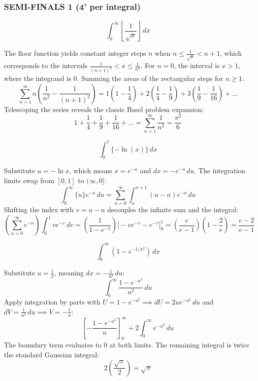 \subsubsection*{SEMI-FINALS 1 (4' per integral)}
\begin{questions}

    \question \[ \int_{0}^{\infty} \left\lfloor \frac{1}{\sqrt{x}} \right\rfloor \,dx \]
    \begin{solution}
        The floor function yields constant integer steps $n$ when $n \le \frac{1}{\sqrt{x}} < n+1$, which corresponds to the intervals $\frac{1}{(n+1)^2} < x \le \frac{1}{n^2}$. For $n=0$, the interval is $x > 1$, where the integrand is $0$. Summing the areas of the rectangular steps for $n \ge 1$:
        \[ \sum_{n=1}^{\infty} n \left( \frac{1}{n^2} - \frac{1}{(n+1)^2} \right) = 1\left(1 - \frac{1}{4}\right) + 2\left(\frac{1}{4} - \frac{1}{9}\right) + 3\left(\frac{1}{9} - \frac{1}{16}\right) + \dots \]
        Telescoping the series reveals the classic Basel problem expansion:
        \[ 1 + \frac{1}{4} + \frac{1}{9} + \frac{1}{16} + \dots = \sum_{n=1}^{\infty} \frac{1}{n^2} = \frac{\pi^2}{6} \]
    \end{solution}

    \question \[ \int_{0}^{1} \{-\ln(x)\} \,dx \]
    \begin{solution}
        Substitute $u = -\ln x$, which means $x = e^{-u}$ and $dx = -e^{-u} \,du$. The integration limits swap from $[0, 1]$ to $(\infty, 0]$:
        \[ \int_{0}^{\infty} \{u\}e^{-u} \,du = \sum_{n=0}^{\infty} \int_{n}^{n+1} (u - n)e^{-u} \,du \]
        Shifting the index with $v = u - n$ decouples the infinite sum and the integral:
        \[ \left(\sum_{n=0}^{\infty} e^{-n}\right) \int_{0}^{1} v e^{-v} \,dv = \left(\frac{1}{1 - e^{-1}}\right) \Big[ -ve^{-v} - e^{-v} \Big]_0^1 = \left(\frac{e}{e-1}\right)\left(1 - \frac{2}{e}\right) = \frac{e-2}{e-1} \]
    \end{solution}

    \question \[ \int_{0}^{\infty} (1 - e^{-1/x^2}) \,dx \]
    \begin{solution}
        Substitute $u = \frac{1}{x}$, meaning $dx = -\frac{1}{u^2} \,du$:
        \[ \int_{0}^{\infty} \frac{1 - e^{-u^2}}{u^2} \,du \]
        Apply integration by parts with $U = 1 - e^{-u^2} \implies dU = 2ue^{-u^2} \,du$ and $dV = \frac{1}{u^2} \,du \implies V = -\frac{1}{u}$:
        \[ \left[ -\frac{1 - e^{-u^2}}{u} \right]_0^\infty + 2\int_{0}^{\infty} e^{-u^2} \,du \]
        The boundary term evaluates to $0$ at both limits. The remaining integral is twice the standard Gaussian integral:
        \[ 2 \left( \frac{\sqrt{\pi}}{2} \right) = \sqrt{\pi} \]
    \end{solution}


\end{questions}
